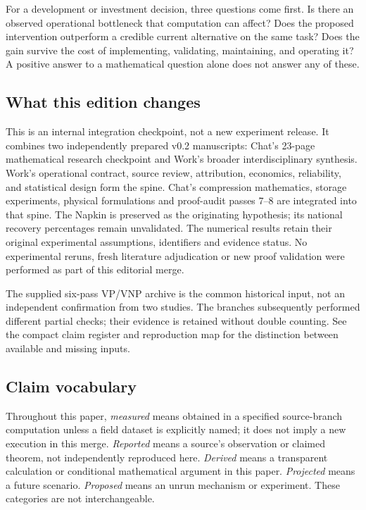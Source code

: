 \documentclass[11pt,letterpaper]{article}
\begin{document}
For a development or investment decision, three questions come first. Is there an observed operational bottleneck that computation can affect? Does the proposed intervention outperform a credible current alternative on the same task? Does the gain survive the cost of implementing, validating, maintaining, and operating it? A positive answer to a mathematical question alone does not answer any of these.

\subsection{What this edition changes}
This is an internal integration checkpoint, not a new experiment release. It combines two independently prepared v0.2 manuscripts: Chat's 23-page mathematical research checkpoint and Work's broader interdisciplinary synthesis. Work's operational contract, source review, attribution, economics, reliability, and statistical design form the spine. Chat's compression mathematics, storage experiments, physical formulations and proof-audit passes 7--8 are integrated into that spine. The Napkin is preserved as the originating hypothesis; its national recovery percentages remain unvalidated. The numerical results retain their original experimental assumptions, identifiers and evidence status. No experimental reruns, fresh literature adjudication or new proof validation were performed as part of this editorial merge.\cite{chatbranch,workbranch}

The supplied six-pass VP/VNP archive is the common historical input, not an independent confirmation from two studies. The branches subsequently performed different partial checks; their evidence is retained without double counting. See the compact claim register and reproduction map for the distinction between available and missing inputs.

\subsection{Claim vocabulary}
Throughout this paper, \emph{measured} means obtained in a specified source-branch computation unless a field dataset is explicitly named; it does not imply a new execution in this merge. \emph{Reported} means a source's observation or claimed theorem, not independently reproduced here. \emph{Derived} means a transparent calculation or conditional mathematical argument in this paper. \emph{Projected} means a future scenario. \emph{Proposed} means an unrun mechanism or experiment. These categories are not interchangeable.
\end{document}
